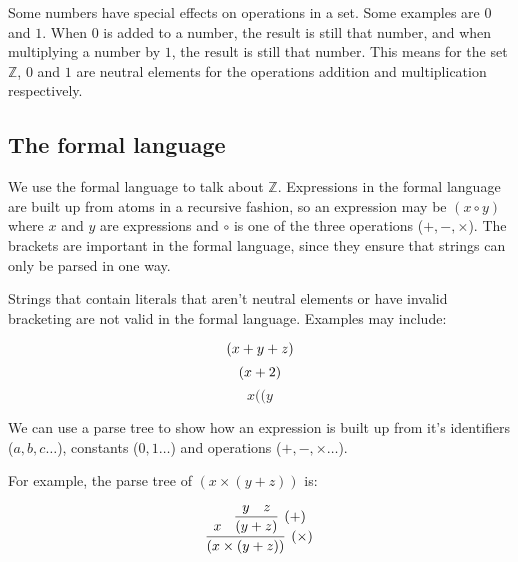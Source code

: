
Some numbers have special effects on operations in a set. Some examples are $0$
and $1$. When $0$ is added to a number, the result is still that number, and
when multiplying a number by $1$, the result is still that number. This means
for the set $\mathbb{Z}$, $0$ and $1$ are neutral elements for the operations
addition and multiplication respectively.

\subsection{The formal language}

We use the formal language to talk about $\mathbb{Z}$. Expressions in the formal
language are built up from atoms in a recursive fashion, so an expression may be
$(x \circ y)$ where $x$ and $y$ are expressions and $\circ$ is one of the three
operations ($+, -, \times$). The brackets are important in the formal language,
since they ensure that strings can only be parsed in one way.

Strings that contain literals that aren't neutral elements or have invalid
bracketing are not valid in the formal language. Examples may include:

\begin{dmath}
	(x + y + z)\\
\end{dmath}
\begin{dmath}
	(x + 2)\\
\end{dmath}
\begin{dmath}
	x((y
\end{dmath}

We can use a parse tree to show how an expression is built up from it's
identifiers ($a, b, c\ldots$), constants ($0, 1\ldots$) and operations ($+, -,
\times\ldots$).

For example, the parse tree of $(x \times (y + z))$ is:


\begin{dmath}
	\infer[(\times)]{(x \times (y + z))}{
		x
		&
		\infer[(+)]{(y + z)}{
			y
			&
			z
		}
	}
\end{dmath}


